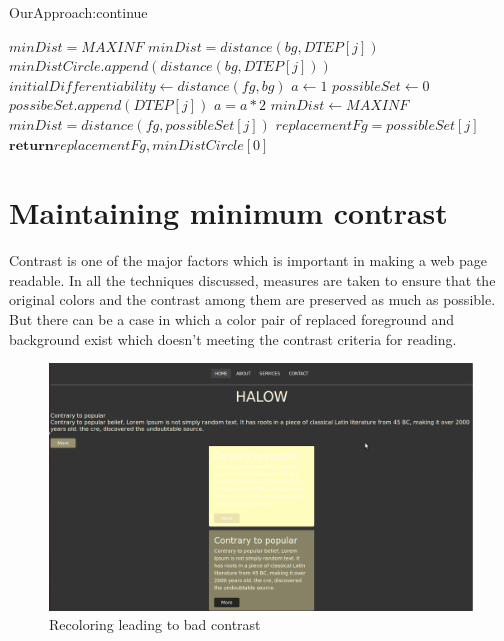 \begin{algorithm}[!htb]
\caption{OurApproach:continue}\label{Our Approach:continue}
\begin{algorithmic}[1]
\State $minDist = MAXINF$
		\State $minDist = distance(bg,DTEP[j])$
	\EndIf
\EndFor
{}
		\State $minDistCircle .append(distance(bg,DTEP[j]))$
	\EndIf
\EndFor
\State $initialDifferentiability \gets distance(fg,bg)$
\State $a \gets 1$
\State $possibleSet \gets 0$
			\State $possibeSet.append(DTEP[j])$
		\EndIf
		\State $a = a*2$
	\EndFor
\EndWhile
\State $minDist \gets MAXINF$
		\State $minDist = distance(fg,possibleSet[j])$
		\State $replacementFg = possibleSet[j]$
	\EndIf
\EndFor
\State $\textbf{return} replacementFg,minDistCircle[0]$
\EndProcedure
\end{algorithmic}
\end{algorithm}



\section{Maintaining minimum contrast} %
\label{Maintaining minimum contrast}
Contrast is one of the major factors which is important in making a web page readable. In all the techniques discussed, measures are taken to ensure that the original colors and the contrast among them are preserved as much as possible. But there can be a case in which a color pair of replaced foreground and background exist which doesn't meeting the contrast criteria for reading.


\begin{figure}[!htb]
\centering
\includegraphics[width=.5\linewidth]{recolor.png}
\caption{Recoloring leading to bad contrast}
\label{fig:sub1}
\end{figure} 

